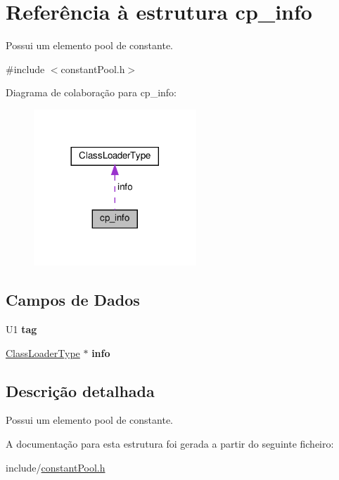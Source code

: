 \hypertarget{structcp__info}{}\section{Referência à estrutura cp\+\_\+info}
\label{structcp__info}


Possui um elemento pool de constante.  




{\ttfamily \#include $<$constant\+Pool.\+h$>$}



Diagrama de colaboração para cp\+\_\+info\+:
\nopagebreak
\begin{figure}[H]
\begin{center}
\leavevmode
\includegraphics[width=173pt]{structcp__info__coll__graph}
\end{center}
\end{figure}
\subsection*{Campos de Dados}
\begin{DoxyCompactItemize}
\item 
\mbox{\label{structcp__info_a850b66fa196e9fc2e898ca41d558e248}} 
U1 {\bfseries tag}
\item 
\mbox{\label{structcp__info_aafa07de27e22632ed56ab8fbffbe2559}} 
\hyperlink{unionClassLoaderType}{Class\+Loader\+Type} $\ast$ {\bfseries info}
\end{DoxyCompactItemize}


\subsection{Descrição detalhada}
Possui um elemento pool de constante. 

A documentação para esta estrutura foi gerada a partir do seguinte ficheiro\+:\begin{DoxyCompactItemize}
\item 
include/\hyperlink{constantPool_8h}{constant\+Pool.\+h}\end{DoxyCompactItemize}
